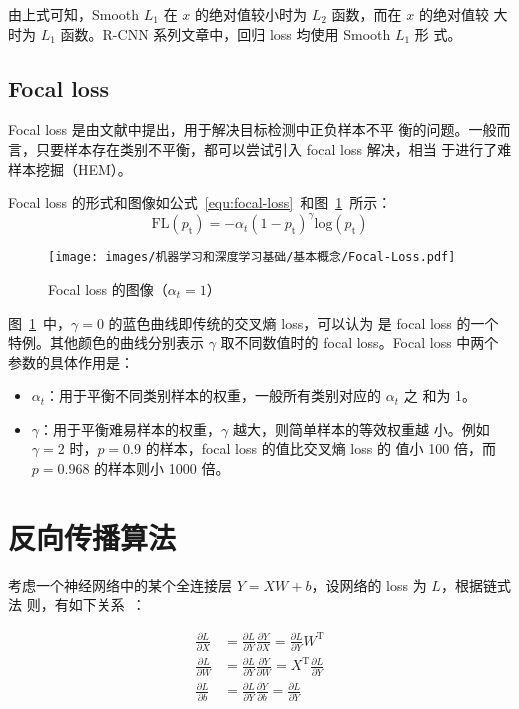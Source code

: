 由上式可知，Smooth $L_1$ 在 $x$ 的绝对值较小时为 $L_2$ 函数，而在 $x$ 的绝对值较
大时为 $L_1$ 函数。R-CNN 系列文章中，回归 loss 均使用 Smooth $L_1$ 形
式。

\subsection{Focal loss}

Focal loss 是由文献中提出，用于解决目标检测中正负样本不平
衡的问题。一般而言，只要样本存在类别不平衡，都可以尝试引入 focal loss 解决，相当
于进行了难样本挖掘（HEM）。

Focal loss 的形式和图像如公式~\ref{equ:focal-loss}~和图~\ref{fig:focal-loss}~所示：
\begin{equation}
  \label{equ:focal-loss}
  \mathrm{FL}(p_{\mathrm{t}}) = - \alpha_t (1-p_{\mathrm{t}})^{\gamma} \mathrm{log}(p_{\mathrm{t}})
\end{equation}

\begin{figure}[ht]
  \centering
  \texttt{[image: images/机器学习和深度学习基础/基本概念/Focal-Loss.pdf]}
  \caption{Focal loss 的图像（$\alpha_t = 1$）}
  \label{fig:focal-loss}
\end{figure}

图~\ref{fig:focal-loss}~中，$\gamma = 0$ 的蓝色曲线即传统的交叉熵 loss，可以认为
是 focal loss 的一个特例。其他颜色的曲线分别表示 $\gamma$ 取不同数值时的 focal
loss。Focal loss 中两个参数的具体作用是：

\begin{itemize}
  \item $\alpha_t$：用于平衡不同类别样本的权重，一般所有类别对应的 $\alpha_t$ 之
    和为 1。
  \item $\gamma$：用于平衡难易样本的权重，$\gamma$ 越大，则简单样本的等效权重越
    小。例如 $\gamma = 2$ 时，$p = 0.9$ 的样本，focal loss 的值比交叉熵 loss 的
    值小 100 倍，而 $p = 0.968$ 的样本则小 1000 倍。
\end{itemize}

\section{反向传播算法}
考虑一个神经网络中的某个全连接层 $Y = XW + b$，设网络的 loss 为 $L$，根据链式法
则，有如下关系~：

\begin{align}
  \label{equ:bp-fc}
  \frac{\partial L}{\partial X} & = \frac{\partial L}{\partial Y} \frac{\partial Y}{\partial X} = \frac{\partial L}{\partial Y} W^{\mathrm{T}} \\
  \frac{\partial L}{\partial W} & = \frac{\partial L}{\partial Y} \frac{\partial Y}{\partial W} = X^{\mathrm{T}} \frac{\partial L}{\partial Y}\\
  \frac{\partial L}{\partial b} & = \frac{\partial L}{\partial Y} \frac{\partial Y}{\partial b} = \frac{\partial L}{\partial Y}
\end{align}

